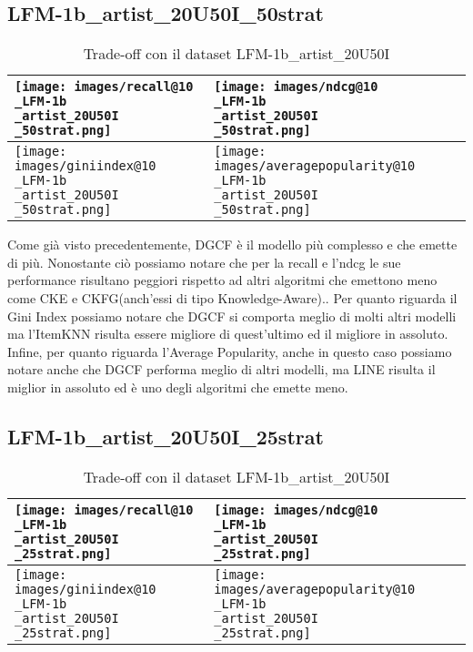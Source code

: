\subsection{LFM-1b\_artist\_20U50I\_50strat}


\begin{table}[H]
    \centering
    \footnotesize
    \setlength\tabcolsep{0pt}
    \begin{tabularx}{\textwidth}{|X|X|}
        \hline
        \texttt{[image: images/recall@10\\\_LFM-1b\\\_artist\_20U50I\\\_50strat.png]} &
        \texttt{[image: images/ndcg@10\\\_LFM-1b\\\_artist\_20U50I\\\_50strat.png]} \\
        \hline
        \texttt{[image: images/giniindex@10\\\_LFM-1b\\\_artist\_20U50I\\\_50strat.png]} &
        \texttt{[image: images/averagepopularity@10\\\_LFM-1b\\\_artist\_20U50I\\\_50strat.png]} \\
        \hline
    \end{tabularx}
    \caption{Trade-off con il dataset LFM-1b\_artist\_20U50I}
    \label{tab:emissions_info}
\end{table}


\noindent Come già visto precedentemente, DGCF è il modello più complesso e che emette di più. Nonostante ciò possiamo notare che per la recall e l'ndcg le sue performance risultano peggiori rispetto ad altri algoritmi che emettono meno come CKE e CKFG(anch'essi di tipo Knowledge-Aware)..
Per quanto riguarda il Gini Index possiamo notare che DGCF si comporta meglio di molti altri modelli ma l'ItemKNN risulta essere migliore di quest'ultimo ed il migliore in assoluto.
Infine, per quanto riguarda l'Average Popularity, anche in questo caso possiamo notare anche che DGCF performa meglio di altri modelli, ma LINE risulta il miglior in assoluto ed è uno degli algoritmi che emette meno.



\subsection{LFM-1b\_artist\_20U50I\_25strat}


\begin{table}[H]
    \centering
    \footnotesize
    \setlength\tabcolsep{0pt}
    \begin{tabularx}{\textwidth}{|X|X|}
        \hline
        \texttt{[image: images/recall@10\\\_LFM-1b\\\_artist\_20U50I\\\_25strat.png]} &
        \texttt{[image: images/ndcg@10\\\_LFM-1b\\\_artist\_20U50I\\\_25strat.png]} \\
        \hline
        \texttt{[image: images/giniindex@10\\\_LFM-1b\\\_artist\_20U50I\\\_25strat.png]} &
        \texttt{[image: images/averagepopularity@10\\\_LFM-1b\\\_artist\_20U50I\\\_25strat.png]} \\
        \hline
    \end{tabularx}
    \caption{Trade-off con il dataset LFM-1b\_artist\_20U50I}
    \label{tab:emissions_info}
\end{table}


